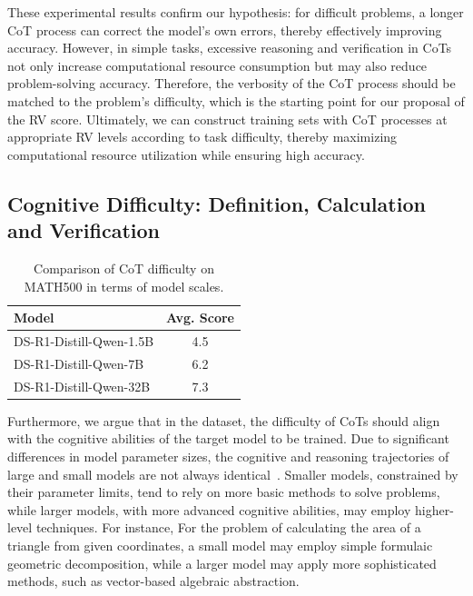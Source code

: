\documentclass{article}
\begin{document}
These experimental results confirm our hypothesis: for difficult problems, a longer CoT process can correct the model’s own errors, thereby effectively improving accuracy. However, in simple tasks, excessive reasoning and verification in CoTs not only increase computational resource consumption but may also reduce problem-solving accuracy. Therefore, the verbosity of the CoT process should be matched to the problem’s difficulty, which is the starting point for our proposal of the RV score. Ultimately, we can construct training sets with CoT processes at appropriate RV levels according to task difficulty, thereby maximizing computational resource utilization while ensuring high accuracy.








\subsection{Cognitive Difficulty: Definition, Calculation and Verification}



\begin{table}
    \centering
    \caption{Comparison of CoT difficulty on MATH500 in terms of model scales.}
    \begin{small}
    \begin{tabular}{l|c}
        \hline
        \textbf{Model} & \textbf{Avg. Score} \\
        \hline
        DS-R1-Distill-Qwen-1.5B & 4.5 \\
        DS-R1-Distill-Qwen-7B & 6.2 \\
        DS-R1-Distill-Qwen-32B & 7.3 \\
        \hline
    \end{tabular}
    \end{small}
    \label{tab:cd_exp}
\end{table}


Furthermore, we argue that in the dataset, the difficulty of CoTs should align with the cognitive abilities of the target model to be trained. Due to significant differences in model parameter sizes, the cognitive and reasoning trajectories of large and small models are not always identical~\cite{DBLP:conf/emnlp/Yan0ZHHZ23,DBLP:conf/iclr/0006LCF24}. Smaller models, constrained by their parameter limits, tend to rely on more basic methods to solve problems, while larger models, with more advanced cognitive abilities, may employ higher-level techniques. For instance, For the problem of calculating the area of a triangle from given coordinates, a small model may employ simple formulaic geometric decomposition, while a larger model may apply more sophisticated methods, such as vector-based algebraic abstraction. 
\end{document}
